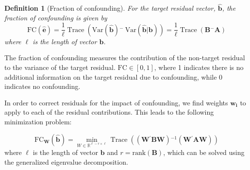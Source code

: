 \documentclass{article} %
\newcommand{\al}[1]{{\color{red} #1}}
\newtheorem{definition}{Definition}
\newcommand{\inv}{\ensuremath{^{-1}}}
\newcommand{\ginv}{\ensuremath{^{-}}}
\newcommand{\trans}{\ensuremath{^\prime}}
\newcommand{\var}{\ensuremath{\mathrm{Var}}}
\DeclareMathOperator{\tr}{Trace}
\begin{document}

\begin{definition}[Fraction of confounding]
For the target residual vector, $\widehat{\bm{b}}$, the fraction of confounding is given by
%
\begin{equation}\label{eq:fc2}
\text{FC}(\widehat{\bm{e}}) = 
\frac{1}{\ell} \tr\left( \var(\widehat{\bm{b}})\ginv \  \var(\widehat{\bm{b}} | \bm{b} ) \right) = \frac{1}{\ell} \tr\left( \bm{B}\ginv\bm{A} \right)
\end{equation}
where $\ell$ is the length of vector $\bm{b}$.
\end{definition}
The fraction of confounding measures the contribution of the non-target residual to the variance of the target residual. $\text{FC} \in [0,1]$, where 1 indicates there is no additional information on the target residual due to confounding, while 0 indicates no confounding. %



In order to correct residuals for the impact of confounding, we find weights $\bm{w_i}$ to apply to each of the residual contributions. This leads to the following minimization problem:

\begin{equation}\label{eq:minimize}
\text{FC}_{\bm{W}}(\widehat{\bm{b}}) = \min_{W \in \mathbb{R}^{\ell-r \times \ell} } 
\tr\left( \left(\bm{W\trans B W} \right)\inv \left(\bm{W\trans A W}\right) \right)
\end{equation}
where $\ell$ is the length of vector $\bm{b}$ and $r = \text{rank}(\bm{B})$, \al{which can be solved using the generalized eigenvalue decomposition.} \\
\end{document}
